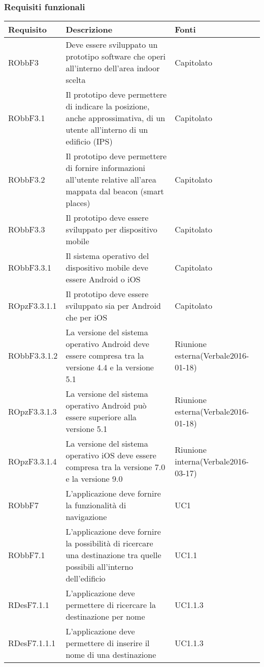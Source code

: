 \documentclass[../AnalisiDeiRequisiti.tex]{subfiles}
\begin{document}
\subsubsection{Requisiti funzionali}
\begin{longtabu} to \textwidth {X X[2] X}
	\toprule
	\textbf{Requisito} & \textbf{Descrizione} & \textbf{Fonti}\\
	\midrule
	\endhead
	RObbF3 & Deve essere sviluppato un prototipo software che operi all'interno dell'area indoor scelta & Capitolato \\ 
	\midrule 
	RObbF3.1 & Il prototipo deve permettere di indicare la posizione, anche approssimativa, di un utente all'interno di un edificio (IPS) & Capitolato \\ 
	\midrule 
	RObbF3.2 & Il prototipo deve permettere di fornire informazioni all'utente relative all'area mappata dal beacon (smart places) & Capitolato \\ 
	\midrule 
	RObbF3.3 & Il prototipo deve essere sviluppato per dispositivo mobile & Capitolato \\ 
	\midrule 
	RObbF3.3.1 & Il sistema operativo del dispositivo mobile deve essere Android o iOS & Capitolato \\ 
	\midrule 
	ROpzF3.3.1.1 & Il prototipo deve essere sviluppato sia per Android che per iOS & Capitolato \\ 
	\midrule 
	RObbF3.3.1.2 & La versione del sistema operativo Android deve essere compresa tra la versione 4.4 e la versione 5.1 & Riunione esterna(Verbale2016-01-18) \\ 
	\midrule 
	ROpzF3.3.1.3 & La versione del sistema operativo Android può essere superiore alla versione 5.1 & Riunione esterna(Verbale2016-01-18) \\ 
	\midrule 
	ROpzF3.3.1.4 & La versione del sistema operativo iOS deve essere compresa tra la versione 7.0 e la versione 9.0 & Riunione interna(Verbale2016-03-17) \\ 
	\midrule 
	RObbF7 & L'applicazione deve fornire la funzionalità di navigazione & UC1 \\ 
	\midrule 
	RObbF7.1 & L'applicazione deve fornire la possibilità di ricercare una destinazione tra quelle possibili all'interno dell'edificio & UC1.1 \\ 
	\midrule 
	RDesF7.1.1 & L'applicazione deve permettere di ricercare la destinazione per nome & UC1.1.3 \\ 
	\midrule 
	RDesF7.1.1.1 & L'applicazione deve permettere di inserire il nome di una destinazione & UC1.1.3 \\ 

\end{longtabu}
\end{document}

